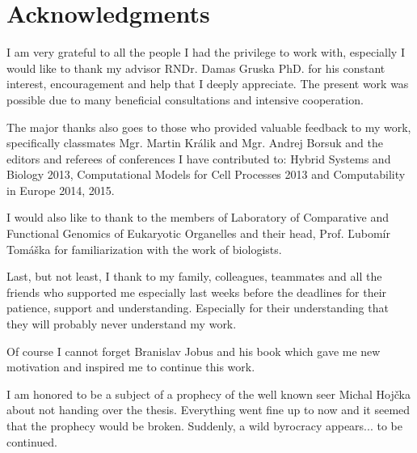 \chapter*{Acknowledgments}

I am very grateful to all the people I had the privilege to work with, especially I would like to thank my advisor RNDr. Damas Gruska PhD. for his constant interest, encouragement and help that I deeply appreciate.
The present work was possible due to many beneficial consultations and intensive cooperation.

The major thanks also goes to those who provided valuable feedback to my work, specifically classmates Mgr. Martin Králik and Mgr. Andrej Borsuk and the editors and referees of conferences I have contributed to: Hybrid Systems and Biology 2013, Computational Models for Cell Processes 2013 and Computability in Europe 2014, 2015.

I would also like to thank to the members of Laboratory of Comparative and Functional Genomics of Eukaryotic Organelles and their head, Prof. Ľubomír Tomáška for familiarization with the work of biologists.

Last, but not least, I thank to my family, colleagues, teammates and all the friends who supported me especially last weeks before the deadlines for their patience, support and understanding.
\ifdefined\godzilla
  Especially for their understanding that they will probably never understand my work.

  Of course I cannot forget Branislav Jobus and his book \cite{Jobus10Ancijas} which gave me new motivation and inspired me to continue this work.

  I am honored to be a subject of a prophecy of the well known seer Michal Hojčka about not handing over the thesis. Everything went fine up to now and it seemed that the prophecy would be broken. Suddenly, a wild byrocracy appears... to be continued.  
\fi
